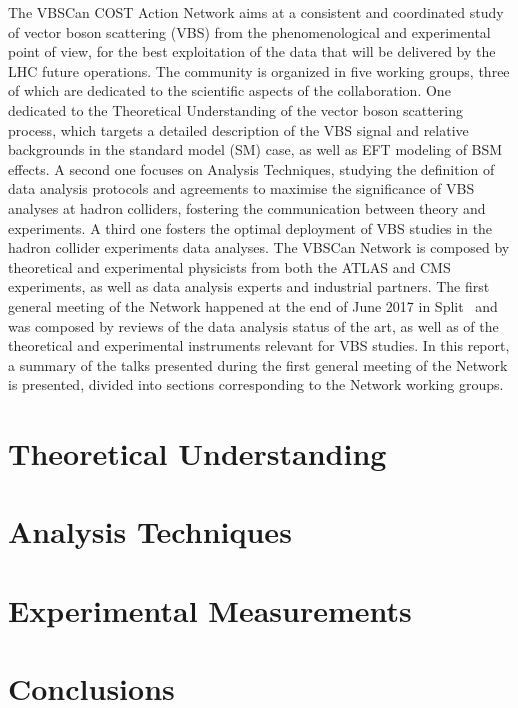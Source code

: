 \documentclass{article}
\begin{document}
The VBSCan COST Action Network aims at a consistent and coordinated study of vector boson scattering (VBS)
from the phenomenological and experimental point of view, 
for the best exploitation of the data that will be delivered by the LHC future operations.
The community is organized in five working groups,
three of which are dedicated to the scientific aspects of the collaboration.
One dedicated to the Theoretical Understanding of the vector boson scattering process,
which targets a detailed description of the VBS signal 
and relative backgrounds in the standard model (SM) case, 
as well as EFT modeling of BSM effects.
A second one focuses on Analysis Techniques,
studying the definition of data analysis protocols and agreements 
to maximise the significance of VBS analyses at hadron colliders, 
fostering the communication between theory and experiments.
A third one fosters the optimal deployment of VBS studies 
in the hadron collider experiments data analyses.
\newline{}
The VBSCan Network is composed by theoretical and experimental physicists from both the ATLAS and CMS experiments,
as well as data analysis experts and industrial partners.
The first general meeting of the Network happened at the end of June 2017 in Split~\cite{Ablikim:2017duf}
and was composed by reviews of the data analysis status of the art,
as well as of the theoretical and experimental instruments
relevant for VBS studies.
In this report,
a summary of the talks presented during the first general meeting of the Network is presented,
divided into sections corresponding to the Network working groups.

\section{Theoretical Understanding}



\section{Analysis Techniques}



\section{Experimental Measurements}



\section*{Conclusions}

\printbibliography
\end{document}
